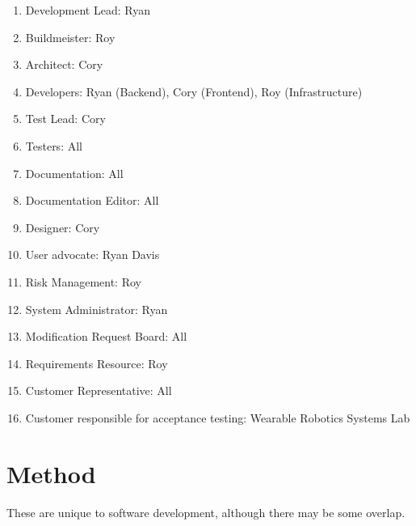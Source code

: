  
\begin{enumerate}
\item Development Lead: Ryan
\item Buildmeister: Roy
\item Architect: Cory
\item Developers: Ryan (Backend), Cory (Frontend), Roy (Infrastructure)
\item Test Lead: Cory
\item Testers: All
\item Documentation: All
\item Documentation Editor: All
\item Designer: Cory
\item User advocate: Ryan Davis
\item Risk Management: Roy
\item System Administrator: Ryan
\item Modification Request Board: All
\item Requirements Resource: Roy
\item Customer Representative: All
\item Customer responsible for acceptance testing: Wearable Robotics Systems Lab
\end{enumerate}


\section{Method}
These are unique to software development, although there may be some overlap.

